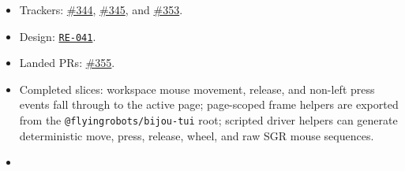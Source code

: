 \begin{itemize}
\tightlist
\item
  Trackers: \href{https://github.com/flyingrobots/bijou/issues/344}{\#344}, \href{https://github.com/flyingrobots/bijou/issues/345}{\#345}, and \href{https://github.com/flyingrobots/bijou/issues/353}{\#353}.
\item
  Design: \href{https://github.com/flyingrobots/bijou/blob/cbd70612140e7a450d764b3c7be1c6af878b99bc/docs/design/RE-041-v72-framework-input-stabilization.md}{\texttt{R\allowbreak{}E\allowbreak{}-\allowbreak{}0\allowbreak{}4\allowbreak{}1}}.
\item
  Landed PRs: \href{https://github.com/flyingrobots/bijou/pull/355}{\#355}.
\item
  Completed slices: workspace mouse movement, release, and non-left press events fall through to the active page; page-scoped frame helpers are exported from the \texttt{@\allowbreak{}f\allowbreak{}l\allowbreak{}y\allowbreak{}i\allowbreak{}n\allowbreak{}g\allowbreak{}r\allowbreak{}o\allowbreak{}b\allowbreak{}o\allowbreak{}t\allowbreak{}s\allowbreak{}/\allowbreak{}b\allowbreak{}i\allowbreak{}j\allowbreak{}o\allowbreak{}u\allowbreak{}-\allowbreak{}t\allowbreak{}u\allowbreak{}i} root; scripted driver helpers can generate deterministic move, press, release, wheel, and raw SGR mouse sequences.
\item

\end{itemize}
